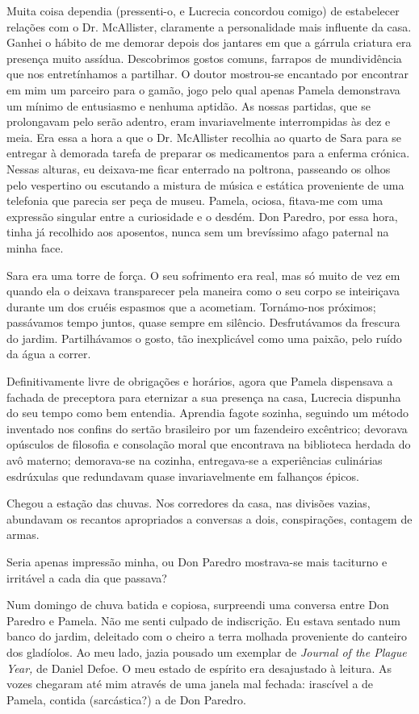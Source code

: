 Muita coisa dependia (pressenti-o, e Lucrecia concordou comigo) de
estabelecer relações com o Dr. McAllister, claramente a personalidade mais influente da casa. Ganhei o hábito de me
demorar depois dos jantares em que a gárrula criatura era presença muito
assídua. Descobrimos gostos comuns, farrapos de mundividência que nos
entretínhamos a partilhar. O doutor mostrou-se encantado por encontrar
em mim um parceiro para o gamão, jogo pelo qual apenas Pamela demonstrava um mínimo de entusiasmo e nenhuma aptidão. As nossas partidas,
que se prolongavam pelo serão adentro, eram invariavelmente
interrompidas às dez e meia. Era essa a hora a que o Dr. McAllister
recolhia ao quarto de Sara para se entregar à demorada tarefa de
preparar os medicamentos para a enferma crónica. Nessas alturas, eu
deixava-me ficar enterrado na poltrona, passeando os olhos pelo
vespertino ou escutando a mistura de música e estática proveniente de
uma telefonia que parecia ser peça de museu. Pamela, ociosa, fitava-me
com uma expressão singular entre a curiosidade e o desdém. Don Paredro,
por essa hora, tinha já recolhido aos aposentos, nunca sem um brevíssimo
afago paternal na minha face.

Sara era uma torre de força. O seu sofrimento era real, mas só muito de
vez em quando ela o deixava transparecer pela maneira como o seu corpo
se inteiriçava durante um dos cruéis espasmos que a acometiam.
Tornámo-nos próximos; passávamos tempo juntos, quase sempre em silêncio.
Desfrutávamos da frescura do jardim. Partilhávamos o gosto, tão inexplicável como uma paixão, pelo ruído da água a correr.

Definitivamente livre de obrigações e horários, agora que Pamela
dispensava a fachada de preceptora para eternizar a sua presença na
casa, Lucrecia dispunha do seu tempo como bem entendia. Aprendia fagote
sozinha, seguindo um método inventado nos confins do sertão brasileiro
por um fazendeiro excêntrico; devorava opúsculos de filosofia e
consolação moral que encontrava na biblioteca herdada do avô materno; demorava-se
na cozinha, entregava-se a experiências culinárias esdrúxulas que
redundavam quase invariavelmente em falhanços épicos.

Chegou a estação das chuvas. Nos corredores da casa, nas divisões
vazias, abundavam os recantos apropriados a conversas a dois,
conspirações, contagem de armas.

Seria apenas impressão minha, ou Don Paredro mostrava-se mais taciturno e irritável a cada dia que passava?

Num domingo de chuva batida e copiosa, surpreendi uma conversa entre Don
Paredro e Pamela. Não me senti culpado de indiscrição. Eu estava sentado
num banco do jardim, deleitado com o cheiro a terra molhada
proveniente do canteiro dos gladíolos. Ao meu lado, jazia pousado um
exemplar de \emph{Journal of the Plague Year, }de Daniel Defoe. O meu
estado de espírito era desajustado à leitura. As vozes chegaram até mim
através de uma janela mal fechada: irascível a de Pamela, contida
(sarcástica?) a de Don Paredro.

